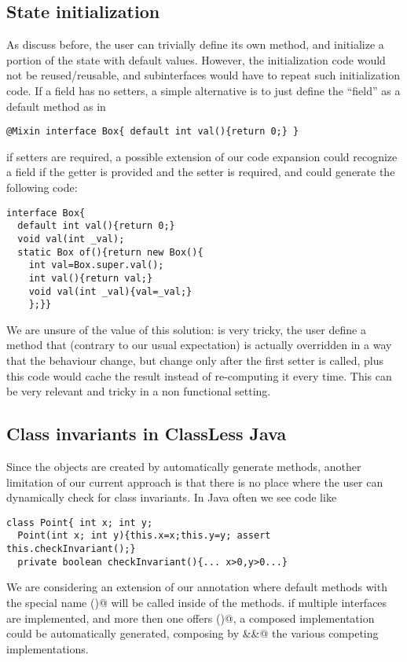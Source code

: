 \subsection{State initialization}

As discuss before, the user can trivially define its own \Q@of@ method, and initialize a portion of the state with default values.
However, the initialization code would not be reused/reusable, and subinterfaces would have to repeat such initialization code.
If a field has no setters, a simple alternative is to just define the ``field'' as a default method as in 
\begin{lstlisting}
@Mixin interface Box{ default int val(){return 0;} }
\end{lstlisting}
if setters are required, a possible extension of our code expansion could recognize a field if the getter is provided and the setter is required, and could generate the following code:
\begin{lstlisting}
interface Box{ 
  default int val(){return 0;} 
  void val(int _val);
  static Box of(){return new Box(){
    int val=Box.super.val();
    int val(){return val;}
    void val(int _val){val=_val;}
    };}}
\end{lstlisting}
We are unsure of the value of this solution: is very tricky, the user define a method that (contrary to our usual expectation) is actually overridden in a way that the behaviour change, but change only after the first setter is called, plus this code would cache the result instead of re-computing it every time. This can be very relevant and tricky in a non functional setting.

\subsection{Class invariants in ClassLess Java}
Since the objects are created by automatically generate methods,
another limitation of our current approach is that there is no place where the user can dynamically check for class invariants.
In Java often we see code like
\begin{lstlisting}
class Point{ int x; int y;
  Point(int x; int y){this.x=x;this.y=y; assert this.checkInvariant();}
  private boolean checkInvariant(){... x>0,y>0...}
\end{lstlisting} 

We are considering an extension of our annotation where 
default methods with the special name \Q@checkInvariant()@ will be called inside of the \Q@of@ methods.
if multiple interfaces are implemented, and more then one offers
\Q@checkInvariant()@,  a composed implementation could be automatically generated, composing by \Q@&&@ the various competing implementations.

